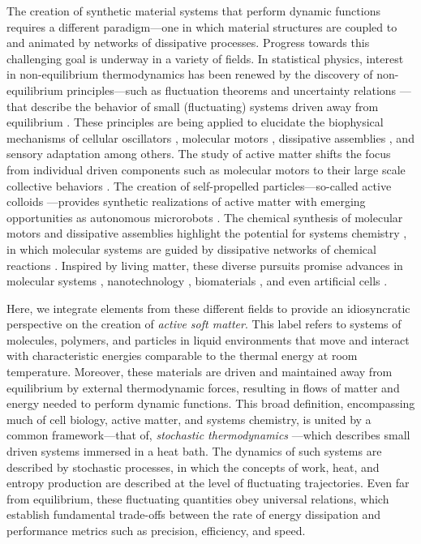 \begin{appendices}
The creation of synthetic material systems that perform dynamic functions requires a different paradigm---one in which material structures are coupled to and animated by networks of dissipative processes.  Progress towards this challenging goal is underway in a variety of fields.  In statistical physics, interest in non-equilibrium thermodynamics \cite{de2013non} has been renewed by the discovery of non-equilibrium principles---such as fluctuation theorems \cite{jarzynski2011equalities} and uncertainty relations \cite{Seifert2018}---that describe the behavior of small (fluctuating) systems driven away from equilibrium \cite{Seifert2012,Marsland2018}.  These principles are being applied to elucidate the biophysical mechanisms of cellular oscillators \cite{Cao2015,Barato2016}, molecular motors \cite{Pietzonka2016,Hess2017}, dissipative assemblies \cite{Nguyen2015, marsland2018active}, and sensory adaptation \cite{Lan2012,Tu2018} among others.  The study of active matter \cite{Marchetti2013} shifts the focus from individual driven components such as molecular motors to their large scale collective behaviors \cite{Needleman2017, Doostmohammadi2018}. The creation of self-propelled particles---so-called active colloids \cite{Bechinger2016, illien2017fuelled, Zhang2017}---provides synthetic realizations of active matter with emerging opportunities as autonomous microrobots \cite{Palagi2018, han2018engineering}. The chemical synthesis of molecular motors \cite{kassem2017artificial,Astumian2017} and dissipative assemblies \cite{VanRossum2017,De2018} highlight the potential for systems chemistry \cite{Ashkenasy2017}, in which molecular systems are guided by dissipative networks of chemical reactions \cite{Epstein2016, Grzybowski2017}. Inspired by living matter, these diverse pursuits promise advances in molecular systems \cite{merindol2017materials}, nanotechnology \cite{Grzybowski2016},  biomaterials \cite{tibbitt2017living}, and even artificial cells \cite{Yewdall2018}.

Here, we integrate elements from these different fields to provide an idiosyncratic perspective on the creation of \emph{active soft matter}. This label refers to systems of molecules, polymers, and particles in liquid environments that move and interact with characteristic energies comparable to the thermal energy at room temperature. Moreover, these materials are driven and maintained away from equilibrium by external thermodynamic forces, resulting in flows of matter and energy needed to perform dynamic functions. This broad definition, encompassing much of cell biology, active matter, and systems chemistry, is united by a common framework---that of, \emph{stochastic thermodynamics} \cite{Seifert2012}---which describes small driven systems immersed in a heat bath.  The dynamics of such systems are described by stochastic processes, in which the concepts of work, heat, and entropy production are described at the level of fluctuating trajectories. Even far from equilibrium, these fluctuating quantities obey universal relations, which establish fundamental trade-offs between the rate of energy dissipation and performance metrics such as precision, efficiency, and speed. 


\end{appendices}
